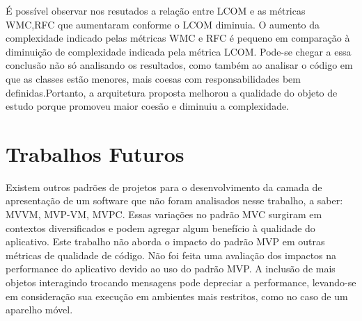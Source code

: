 É possível observar nos resutados a relação entre LCOM e as métricas 
WMC,RFC que aumentaram conforme o LCOM diminuia. O aumento da complexidade
indicado pelas métricas WMC e RFC é pequeno em comparação à diminuição de
complexidade indicada pela métrica LCOM. Pode-se chegar a essa conclusão não só
analisando os resultados, como também ao analisar o código em que as classes
estão menores, mais coesas com responsabilidades bem definidas.Portanto, a
arquitetura proposta melhorou a qualidade do objeto de estudo porque promoveu
maior coesão e diminuiu a complexidade.

 
\section{Trabalhos Futuros}

Existem outros padrões de projetos para o desenvolvimento da camada de
apresentação de um software que não foram analisados nesse trabalho, a saber: 
MVVM, MVP-VM, MVPC. Essas variações no padrão MVC surgiram em contextos
diversificados e podem agregar algum benefício à qualidade do aplicativo.
Este trabalho não aborda o impacto do padrão MVP em outras métricas de qualidade
de código.
Não foi feita uma avaliação dos impactos na performance do aplicativo devido ao
uso do padrão MVP. A inclusão de mais objetos interagindo trocando mensagens
pode depreciar a performance, levando-se em consideração sua execução em
ambientes mais restritos, como no caso de um aparelho móvel.